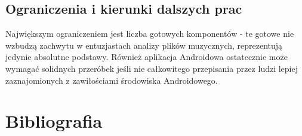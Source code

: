 \section{Ograniczenia i kierunki dalszych prac}
Największym ograniczeniem jest liczba gotowych komponentów - te gotowe nie wzbudzą zachwytu w entuzjastach analizy plików muzycznych, reprezentują jedynie absolutne podstawy. Również aplikacja Androidowa ostatecznie może wymagać solidnych przeróbek jeśli nie całkowitego przepisania przez ludzi lepiej zaznajomionych z zawiłościami środowiska Androidowego.

\chapter{Bibliografia}

